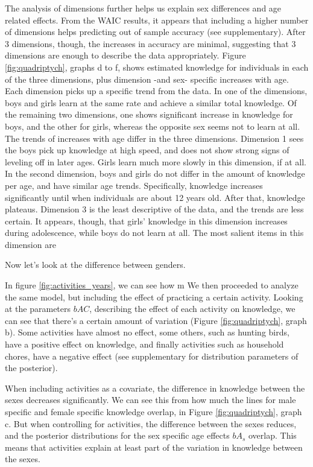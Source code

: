 The analysis of dimensions further helps us explain sex differences and age related effects. From the WAIC results, it appears that including a higher number of dimensions helps predicting out of sample accuracy (see supplementary). After 3 dimensions, though, the increases in accuracy are minimal, suggesting that 3 dimensions are enough to describe the data appropriately. Figure \ref{fig:quadriptych}, graphs d to f, shows estimated knowledge for individuals in each of the three dimensions, plus dimension -and sex- specific increases with age. Each dimension picks up a specific trend from the data. In one of the dimensions, boys and girls learn at the same rate and achieve a similar total knowledge. Of the remaining two dimensions, one shows significant increase in knowledge for boys, and the other for girls, whereas the opposite sex seems not to learn at all. The trends of increases with age differ in the three dimensions. Dimension 1 sees the boys pick up knowledge at high speed, and does not show strong signs of leveling off in later ages. Girls learn much more slowly in this dimension, if at all.  In the second dimension, boys and girls do not differ in the amount of knowledge per age, and have similar age trends. Specifically, knowledge increases significantly until when individuals are about 12 years old. After that, knowledge plateaus. Dimension 3 is the least descriptive of the data, and the trends are less certain. It appears, though, that girls' knowledge in this dimension increases during adolescence, while boys do not learn at all. The most salient items in this dimension are  

Now let’s look at the difference between genders. 

In figure \ref{fig:activities_years}, we can see how m
We then proceeded to analyze the same model, but including the effect of practicing a certain activity. Looking at the parameters $bAC$, describing the effect of each activity on knowledge, we can see that there's a certain amount of variation (Figure \ref{fig:quadriptych}, graph b). Some activities have almost no effect, some others, such as hunting birds, have a positive effect on knowledge, and finally activities such as household chores, have a negative effect (see supplementary for distribution parameters of the posterior). 

When including activities as a covariate, the difference in knowledge between the sexes decreases significantly. We can see this from how much the lines for male specific and female specific knowledge overlap, in Figure \ref{fig:quadriptych}, graph c. But when controlling for activities, the difference between the sexes reduces, and the posterior distributions for the sex specific age effects $bA_s$ overlap. This means that activities explain at least part of the variation in knowledge between the sexes. 


